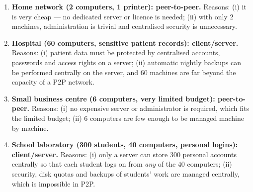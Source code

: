 \documentclass[11pt]{article}
\begin{document}
\begin{corrige}
\begin{enumerate}
\item \textbf{Home network (2 computers, 1 printer): peer-to-peer.} Reasons: (i) it is very cheap — no dedicated server or licence is needed; (ii) with only 2 machines, administration is trivial and centralised security is unnecessary.
\item \textbf{Hospital (60 computers, sensitive patient records): client/server.} Reasons: (i) patient data must be protected by centralised accounts, passwords and access rights on a server; (ii) automatic nightly backups can be performed centrally on the server, and 60 machines are far beyond the capacity of a P2P network.
\item \textbf{Small business centre (6 computers, very limited budget): peer-to-peer.} Reasons: (i) no expensive server or administrator is required, which fits the limited budget; (ii) 6 computers are few enough to be managed machine by machine.
\item \textbf{School laboratory (300 students, 40 computers, personal logins): client/server.} Reasons: (i) only a server can store 300 personal accounts centrally so that each student logs on from \emph{any} of the 40 computers; (ii) security, disk quotas and backups of students' work are managed centrally, which is impossible in P2P.
\end{enumerate}
\end{corrige}
\end{document}
